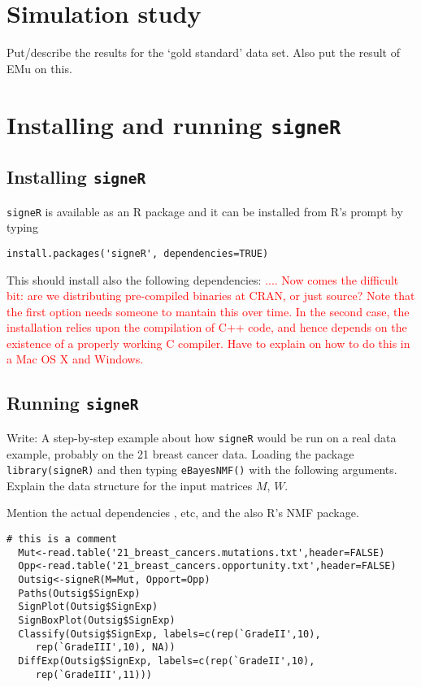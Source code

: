 \documentclass[11pt]{amsart}
\theoremstyle{definition}
\theoremstyle{remark}
\begin{document}
\section{Simulation study}
Put/describe the results for the `gold standard' data set. Also put
the result of EMu on this. 

\section{Installing and running \texttt{signeR}}
\subsection{Installing \texttt{signeR}}
\texttt{signeR} is available as an R package and it can be installed
from R's prompt by typing
\begin{lstlisting}[]
  install.packages('signeR', dependencies=TRUE)
\end{lstlisting}
This should install also the following dependencies:
\textcolor{red}{....  Now comes the difficult bit: are we distributing
pre-compiled binaries at CRAN, or just source? Note that the first
option needs someone to mantain this over time. In the second case,
the installation relies upon the compilation of C++ code, and hence
depends on the existence of a properly working C compiler. Have to
explain on how to do this in a Mac OS X and Windows.}


\subsection{Running \texttt{signeR}}
Write: A step-by-step example about how \texttt{signeR} would be run
on a real data example, probably on the 21 breast cancer data.
Loading the package \verb+library(signeR)+ and then typing
\verb+eBayesNMF()+ with the following arguments. Explain the data
structure for the input matrices $M$, $W$.


Mention the actual dependencies \cite{Boo}, etc, and the also
R's NMF package.
\begin{lstlisting}[]
  # this is a comment
  Mut<-read.table('21_breast_cancers.mutations.txt',header=FALSE)
  Opp<-read.table('21_breast_cancers.opportunity.txt',header=FALSE)
  Outsig<-signeR(M=Mut, Opport=Opp)  
  Paths(Outsig$SignExp)
  SignPlot(Outsig$SignExp)
  SignBoxPlot(Outsig$SignExp)
  Classify(Outsig$SignExp, labels=c(rep(`GradeII',10),
     rep(`GradeIII',10), NA))
  DiffExp(Outsig$SignExp, labels=c(rep(`GradeII',10),
     rep(`GradeIII',11)))
\end{lstlisting}
\end{document}
